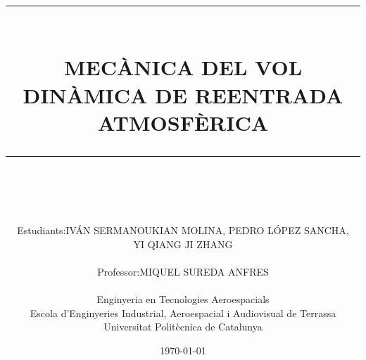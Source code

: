 
\title{
    \begin{center}
        \normalsize %
        \rule{\textwidth}{2pt} \\ [0.5cm]
        \LARGE \textbf{\uppercase{Mecànica del Vol \\ 
        \large{Dinàmica de Reentrada Atmosfèrica}}} \\
        \rule{\linewidth}{2pt}  \\ [0.5cm]
        \normalsize  \vspace*{5\baselineskip}
    \end{center}
}

\author{
    \begin{tabular}{rl}
        Estudiants:    & \uppercase{Iván Sermanoukian Molina}, \uppercase{Pedro López Sancha}, \\
                    & \uppercase{Yi Qiang Ji Zhang} \\ \\
        Professor:  & \uppercase{Miquel Sureda Anfres} \\
    \end{tabular}
    \vspace{1cm} \\
    Enginyeria en Tecnologies Aeroespacials \\
    \vspace{0.1cm}
    Escola d'Enginyeries Industrial, Aeroespacial i Audiovisual de Terrassa \\
    \vspace{0.1cm}
    Universitat Politècnica de Catalunya \\
    \vspace{0.5cm} 
}

\date{\today}

\begin{titlepage}
    \vspace*{\fill}
    \begin{center}
        \thetitle
        \large{\theauthor}
        \thedate
    \end{center}
    \vspace*{\fill}
\end{titlepage}


